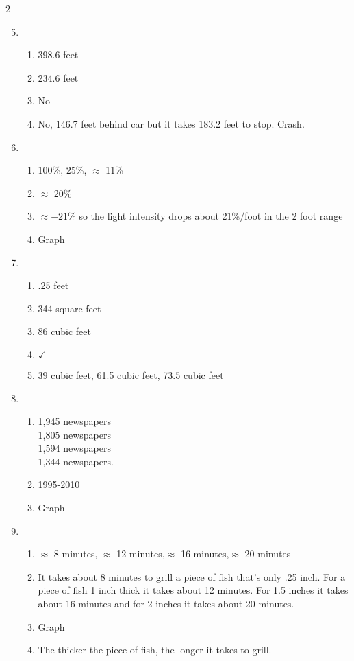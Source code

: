 \begin{multicols} {2}
\begin{enumerate}
\setcounter{enumi}{4}

\item %
\begin{enumerate}
\item 398.6 feet
\item 234.6 feet
\item No
\item No, 146.7 feet behind car but it takes 183.2 feet to stop.  Crash.
\end{enumerate}

\item %
\begin{enumerate}
\item 100\%, 25\%, $\approx$ 11\%
\item $\approx$ 20\%
\item $\approx -21\%$  so the light intensity drops about 21\%/foot  in the 2 foot range
\item Graph
\end{enumerate}

\item %
\begin{enumerate}
\item .25 feet
\item 344 square feet
\item 86 cubic feet
\item $\checkmark$
\item 39 cubic feet, 61.5 cubic feet, 73.5 cubic feet
\end{enumerate}

\item %
\begin{enumerate}
\item 1,945 newspapers \\ 1,805 newspapers \\ 1,594 newspapers \\ 1,344 newspapers.
\item 1995-2010
\item Graph
\end{enumerate}

\item %
\begin{enumerate}
\item $\approx$ 8 minutes, $\approx$ 12 minutes,$\approx$ 16 minutes,$\approx$ 20 minutes
\item It takes about 8 minutes to grill a piece of fish that's only .25 inch.  For a piece of fish 1 inch thick it takes about 12 minutes.  For 1.5 inches it takes about 16 minutes and for 2 inches it takes about 20 minutes.
\item Graph
\item The thicker the piece of fish, the longer it takes to grill.
\end{enumerate}


\end{enumerate}
\end{multicols}
